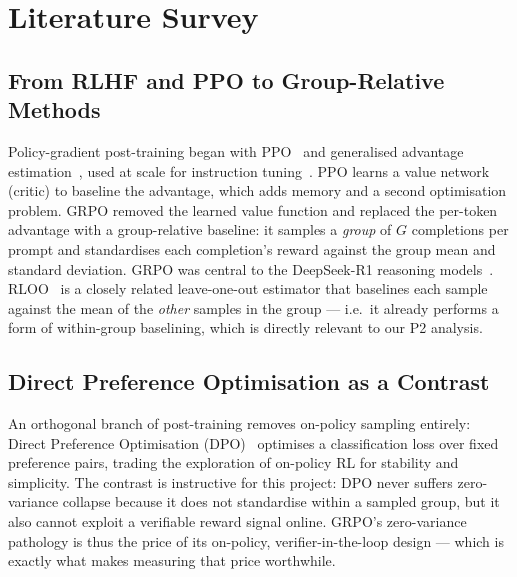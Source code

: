 \chapter{Literature Survey}
\label{ch:lit}

\section{From RLHF and PPO to Group-Relative Methods}
Policy-gradient post-training began with PPO~\cite{schulman2017ppo} and generalised
advantage estimation~\cite{schulman2015gae}, used at scale for instruction
tuning~\cite{ouyang2022instructgpt}. PPO learns a value network (critic) to
baseline the advantage, which adds memory and a second optimisation problem. GRPO
\cite{shao2024deepseekmath} removed the learned value function and replaced the
per-token advantage with a group-relative baseline: it samples a \emph{group} of
$G$ completions per prompt and standardises each completion's reward against the
group mean and standard deviation. GRPO was central to the DeepSeek-R1 reasoning
models~\cite{guo2025r1}. RLOO~\cite{ahmadian2024rloo} is a closely related
leave-one-out estimator that baselines each sample against the mean of the
\emph{other} samples in the group --- i.e.\ it already performs a form of
within-group baselining, which is directly relevant to our P2 analysis.

\section{Direct Preference Optimisation as a Contrast}
An orthogonal branch of post-training removes on-policy sampling entirely: Direct
Preference Optimisation (DPO)~\cite{rafailov2023dpo} optimises a classification
loss over fixed preference pairs, trading the exploration of on-policy RL for
stability and simplicity. The contrast is instructive for this project: DPO never
suffers zero-variance collapse because it does not standardise within a sampled
group, but it also cannot exploit a verifiable reward signal online. GRPO's
zero-variance pathology is thus the price of its on-policy, verifier-in-the-loop
design --- which is exactly what makes measuring that price worthwhile.


